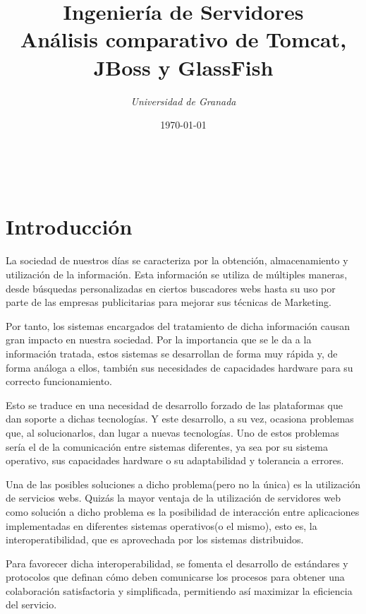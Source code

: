 \documentclass[a4paper, 10pt]{article}
\title{\textbf{Ingeniería de Servidores}\\ %
Análisis comparativo de Tomcat, JBoss y GlassFish} %
\author{ %
{\textit{Universidad de Granada}}} %
\date{\today} %
\makeatletter
\renewcommand{\maketitle}{
  \begin{flushright} %
  
  {\LARGE\@title} %
  
  \vspace{50pt} %
  
  {\large\@author} %
  \\\@date %
  \vspace{40pt} %
  \end{flushright}
}
\makeatother
\begin{document}
\maketitle %

\renewcommand{\abstractname}{Resumen} %
\begin{abstract}
\end{abstract}



\section{Introducción}
	La sociedad de nuestros días se caracteriza por la obtención, almacenamiento y
	utilización de la información. Esta información se utiliza de múltiples maneras,
	desde búsquedas personalizadas en ciertos buscadores webs hasta su uso por parte
	de las empresas publicitarias para mejorar sus técnicas de Marketing.
	
	Por tanto, los sistemas encargados del tratamiento de dicha información causan
	gran impacto en nuestra sociedad. Por la importancia que se le da a la información
	tratada, estos sistemas se desarrollan de forma muy rápida y, de forma análoga a
	ellos, también sus necesidades de capacidades hardware para su correcto funcionamiento.
	
	Esto se traduce en una necesidad de desarrollo forzado de las plataformas que dan
	soporte a dichas tecnologías. Y este desarrollo, a su vez, ocasiona problemas que,
	al solucionarlos, dan lugar a nuevas tecnologías. Uno de estos problemas sería el de
	la comunicación entre sistemas diferentes, ya sea por su sistema operativo, sus
	capacidades hardware o su adaptabilidad y tolerancia a errores.
	
	Una de las posibles soluciones a dicho problema(pero no la única) es la utilización
	de servicios webs. Quizás la mayor ventaja de la utilización de servidores web como
	solución a dicho problema es la posibilidad de interacción entre aplicaciones
	implementadas en diferentes sistemas operativos(o el mismo), esto es, la
	interoperatibilidad, que es aprovechada por los sistemas distribuidos.
	
	Para favorecer dicha interoperabilidad, se fomenta el desarrollo de estándares y
	protocolos que definan cómo deben comunicarse los procesos para obtener una
	colaboración satisfactoria y simplificada, permitiendo así maximizar la eficiencia
	del servicio.
	
\end{document}
